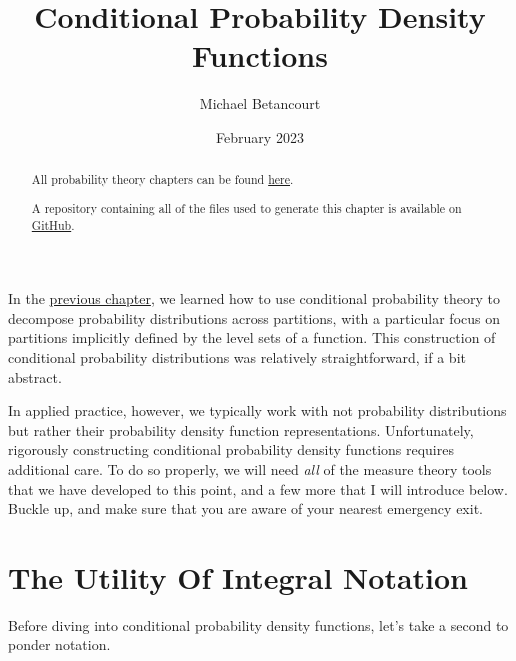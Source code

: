 \documentclass[
  letterpaper,
  DIV=11,
  numbers=noendperiod]{scrartcl}
\title{Conditional Probability Density Functions}
\author{Michael Betancourt}
\date{February 2023}
\renewcommand*\contentsname{Table of contents}
\newcommand\contentsname{Table of contents}
\begin{document}
\maketitle
\begin{abstract}
All probability theory chapters can be found
\href{http://www.symplectomorphic.com/writing/\#part1}{here}.

A repository containing all of the files used to generate this chapter
is available on
\href{https://github.com/betanalpha/quarto_chapters/tree/main/9_conditional_probability_density_functions}{GitHub}.
\end{abstract}

\renewcommand*\contentsname{Table of contents}
{
\hypersetup{linkcolor=}
\setcounter{tocdepth}{3}
\tableofcontents
}
\newcommand{\I}[2]{\mathbb{I}_{#1} \! \left[ #2 \right]}

\newcommand{\E}[2]{\mathbb{E}_{#1} \! \left[ #2 \right]}

\newcommand{\rnd}[2]{\frac{ \mathrm{d} #1}{ \mathrm{d} #2 }}

In the
\href{http://www.symplectomorphic.com/assets/chapters_html/conditional_probability_theory.html}{previous
chapter}, we learned how to use conditional probability theory to
decompose probability distributions across partitions, with a particular
focus on partitions implicitly defined by the level sets of a function.
This construction of conditional probability distributions was
relatively straightforward, if a bit abstract.

In applied practice, however, we typically work with not probability
distributions but rather their probability density function
representations. Unfortunately, rigorously constructing conditional
probability density functions requires additional care. To do so
properly, we will need \emph{all} of the measure theory tools that we
have developed to this point, and a few more that I will introduce
below. Buckle up, and make sure that you are aware of your nearest
emergency exit.

\section{The Utility Of Integral
Notation}\label{the-utility-of-integral-notation}

Before diving into conditional probability density functions, let's take
a second to ponder notation.
\end{document}

